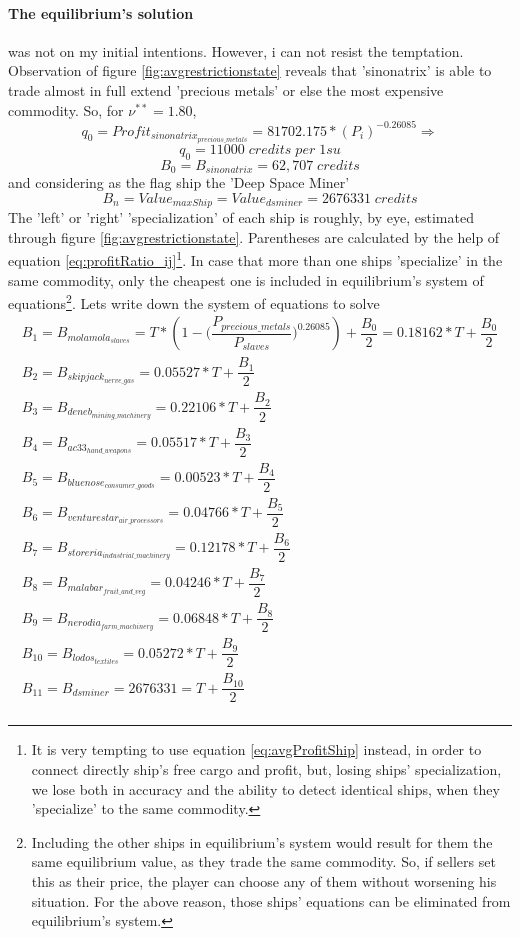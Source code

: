 \documentclass[]{article}
\begin{document}
\paragraph{The equilibrium's solution} was not on my initial intentions. However, i can not resist the temptation. Observation of figure \ref{fig:avgrestrictionstate} reveals that 'sinonatrix' is able to trade almost in full extend 'precious metals' or else the most expensive commodity. So, for $\nu^{**}=1.80$, \[q_{0}=Profit_{sinonatrix_{precious\_metals}}=81702.175*(P_{i})^{-0.26085}\Rightarrow\]
\[q_{0}=11000\;credits\;per\;1su\]
\[B_{0}=B_{sinonatrix}=62,707\;credits\]
and considering as the flag ship the 'Deep Space Miner' \[B_{n}=Value_{maxShip}=Value_{dsminer}=2676331\;credits\]
The 'left' or 'right' 'specialization' of each ship is roughly, by eye, estimated through figure \ref{fig:avgrestrictionstate}. Parentheses are calculated by the help of equation \eqref{eq:profitRatio_ij}\footnote{It is very tempting to use equation \eqref{eq:avgProfitShip} instead, in order to connect directly ship's free cargo and profit, but, losing ships' specialization, we lose both in accuracy and the ability to detect identical ships, when they 'specialize' to the same commodity.}. In case that more than one ships 'specialize' in the same commodity, only the cheapest one is included in equilibrium's system of equations\footnote{Including the other ships in equilibrium's system would result for them the same equilibrium value, as they trade the same commodity. So, if sellers set this as their price, the player can choose any of them without worsening his situation. For the above reason, those ships' equations can be eliminated from equilibrium's system.}. Lets write down the system of equations to solve
\begin{equation*}
	\begin{split}
	B_{1}=B_{molamola_{slaves}}=T*(1-\Big(\dfrac{P_{precious\_metals}}{P_{slaves}}\Big)^{0.26085})+\dfrac{B_{0}}{2}=0.18162*T+\dfrac{B_{0}}{2}\\
	B_{2}=B_{skipjack_{nerve\_gas}}=0.05527*T+\dfrac{B_{1}}{2}\\
	B_{3}=B_{deneb_{mining\_machinery}}=0.22106*T+\dfrac{B_{2}}{2}\\
	B_{4}=B_{ac33_{hand\_weapons}}=0.05517*T+\dfrac{B_{3}}{2}\\
	B_{5}=B_{bluenose_{consumer\_goods}}=0.00523*T+\dfrac{B_{4}}{2}\\
	B_{6}=B_{venturestar_{air\_processors}}=0.04766*T+\dfrac{B_{5}}{2}\\
	B_{7}=B_{storeria_{industrial\_machinery}}=0.12178*T+\dfrac{B_{6}}{2}\\
	B_{8}=B_{malabar_{fruit\_and\_veg}}=0.04246*T+\dfrac{B_{7}}{2}\\
	B_{9}=B_{nerodia_{farm\_machinery}}=0.06848*T+\dfrac{B_{8}}{2}\\
	B_{10}=B_{lodos_{textiles}}=0.05272*T+\dfrac{B_{9}}{2}\\
	B_{11}=B_{dsminer}=2676331=T+\dfrac{B_{10}}{2}\\
	\end{split}
\end{equation*}
\end{document}
